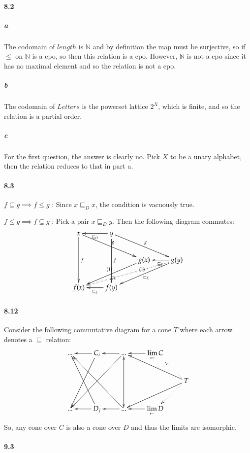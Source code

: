\documentclass{article}
\begin{document}
\newcommand{\N}{\mathbb{N}}

\paragraph{8.2}

\subparagraph{a}
The codomain of $length$ is $\N$ and by definition the map must be surjective, so if $\leq$ on $\N$ is a cpo, so then this relation is a cpo.  However, $\N$ is not a cpo since it has no maximal element and so the relation is not a cpo.

\subparagraph{b}
The codomain of $Letters$ is the powerset lattice $2^{X}$, which is finite, and so the relation is a partial order.

\subparagraph{c}
For the first question, the answer is clearly no.  Pick $X$ to be a unary alphabet, then the relation reduces to that in part a.

\paragraph{8.3}

$f \subseteq g \implies f \leq g$ :  Since $x \sqsubseteq_D x$, the condition is vacuously true.

$f \leq g \implies f \subseteq g$ : Pick a pair $x \sqsubseteq_D y$.  Then the following diagram commutes:
\[
\xymatrix{
x \ar[dd]^f \ar[rrd]^g
& y \ar[l]^{\sqsubseteq_D} \ar[dd]^f \ar[rrd]^g \\
&
& g(x) \ar[lld]^{\sqsubset_E}_{(1)}
& g(y) \ar[l]^{\sqsubseteq_E} \ar[lld]^{\sqsubset_E}_{(1)} \ar@{.>}[llld] \\
f(x) 
& f(y) \ar[l]^{\sqsubseteq_E} }
\]

\paragraph{8.12}
Consider the following commutative diagram for a cone $T$ where each arrow denotes a $\sqsubseteq$ relation:
\[
\xymatrix{
  ...
& C_i \ar[l] \ar[ddl]
& ... \ar[l] \ar[ddll]
& {\mathop{\text{lim}} \limits_{\leftarrow} C} \ar[l] \\
 & & & & T \ar[ull] \ar[dll] \ar@{.>}[ul] \ar@{.>}[dl] \\
  ...
& D_j \ar[l] \ar[uul]
& ... \ar[l] \ar@{<->}[uu] \ar[uull]
& {\mathop{\text{lim}} \limits_{\leftarrow} D} \ar[l] 
}
\]
So, any cone over $C$ is also a cone over $D$ and thus the limits are isomorphic.

\paragraph{9.3}
\end{document}
